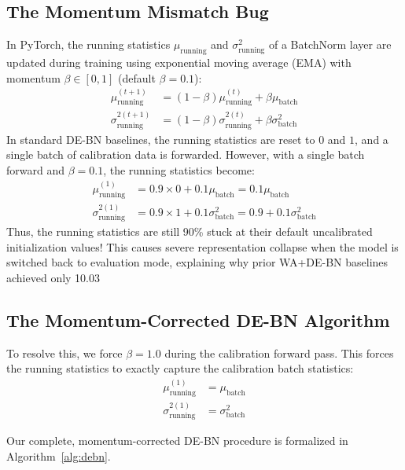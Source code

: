 \documentclass{article}
\theoremstyle{plain}
\theoremstyle{definition}
\theoremstyle{remark}
\begin{document}
\subsection{The Momentum Mismatch Bug}
In PyTorch, the running statistics $\mu_{\text{running}}$ and $\sigma^2_{\text{running}}$ of a BatchNorm layer are updated during training using exponential moving average (EMA) with momentum $\beta \in [0, 1]$ (default $\beta = 0.1$):
\begin{align}
  \mu_{\text{running}}^{(t+1)} &= (1 - \beta) \mu_{\text{running}}^{(t)} + \beta \mu_{\text{batch}} \\
  \sigma_{\text{running}}^{2(t+1)} &= (1 - \beta) \sigma_{\text{running}}^{2(t)} + \beta \sigma_{\text{batch}}^2
\end{align}
In standard DE-BN baselines, the running statistics are reset to $0$ and $1$, and a single batch of calibration data is forwarded.
However, with a single batch forward and $\beta = 0.1$, the running statistics become:
\begin{align}
  \mu_{\text{running}}^{(1)} &= 0.9 \times 0 + 0.1 \mu_{\text{batch}} = 0.1 \mu_{\text{batch}} \\
  \sigma_{\text{running}}^{2(1)} &= 0.9 \times 1 + 0.1 \sigma_{\text{batch}}^2 = 0.9 + 0.1 \sigma_{\text{batch}}^2
\end{align}
Thus, the running statistics are still 90\% stuck at their default uncalibrated initialization values! This causes severe representation collapse when the model is switched back to evaluation mode, explaining why prior WA+DE-BN baselines achieved only 10.03%

\subsection{The Momentum-Corrected DE-BN Algorithm}
To resolve this, we force $\beta = 1.0$ during the calibration forward pass. This forces the running statistics to exactly capture the calibration batch statistics:
\begin{align}
  \mu_{\text{running}}^{(1)} &= \mu_{\text{batch}} \\
  \sigma_{\text{running}}^{2(1)} &= \sigma_{\text{batch}}^2
\end{align}

Our complete, momentum-corrected DE-BN procedure is formalized in Algorithm~\ref{alg:debn}.
\end{document}
